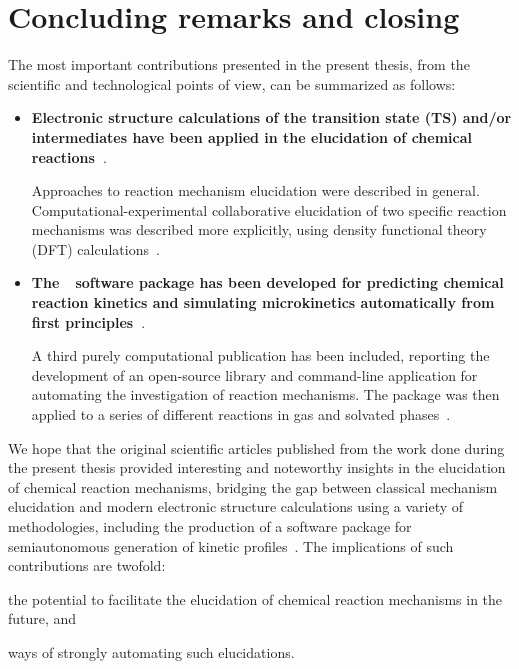 \chapter{Concluding remarks and closing}%
\label{ch:conclusion}


The most important contributions presented in the present thesis,
from the scientific and technological points of view, can be summarized as follows:

\begin{itemize}
	\item \textbf{Electronic structure calculations of the transition state (TS)
		      and/or intermediates have been applied
		      in the elucidation of chemical reactions~\cite{Coelho_2019,Oliveira_2020}}.

	      Approaches to reaction mechanism elucidation were described in general.
	      Computational-experimental collaborative elucidation of two specific reaction mechanisms was described more explicitly,
	      using density functional theory (DFT) calculations~\cite{Coelho_2019,Oliveira_2020}.

	\item \textbf{The~\overreact{}~software package has been developed for predicting chemical reaction kinetics
		      and simulating microkinetics automatically from first principles~\cite{Schneider_2022}}.

	      A third purely computational publication has been included,
	      reporting the development of an open-source library
	      and command-line application for automating the investigation
	      of reaction mechanisms.
	      The package was then applied to a series of different reactions
	      in gas and solvated phases~\cite{Schneider_2022}.
\end{itemize}


We hope that the original scientific articles published from the work done
during the present thesis provided
interesting and noteworthy insights in the elucidation of chemical reaction mechanisms,
bridging the gap between classical mechanism elucidation
and modern electronic structure calculations using a variety of methodologies,
including the production of a software package for semiautonomous generation
of kinetic profiles~\cite{Schneider_2022}.
The implications of such contributions are twofold:
%
\begin{itemize*}
	\item the potential to facilitate the elucidation of chemical reaction mechanisms in the future, and
	\item ways of strongly automating such elucidations.
\end{itemize*}

